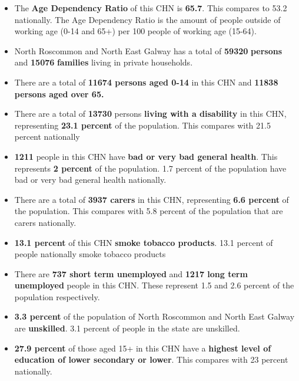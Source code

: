 \documentclass{article}
\begin{document}
\begin{itemize}

\item The \textbf{Age Dependency Ratio} of this CHN is  \textbf{65.7}. This compares to 53.2 nationally. The Age Dependency Ratio is the amount of people outside of working age (0-14 and 65+) per 100 people of working age (15-64). 

\item North Roscommon and North East Galway has a total of \textbf{\num{59320}} \textbf{persons} and  \textbf{\num{15076}} \textbf{families} living in private households.

\item There are a total of \textbf{\num{11674} persons aged 0-14} in this CHN and \textbf{\num{11838} persons aged over 65.} 

\item There are a total of \textbf{\num{13730}} persons \textbf{living with a disability} in this CHN, representing \textbf{23.1 percent} of the population. This compares with  21.5 percent nationally

\item \textbf{\num{1211}} people in this CHN have \textbf{bad or very bad general health}. This represents \textbf{2 percent} of the population. 1.7 percent of the population have bad or very bad general health nationally. 

\item There are a total of \textbf{\num{3937} carers} in this CHN, representing \textbf{6.6 percent} of the population. This compares with 5.8 percent of the population that are carers nationally. 

\item \textbf{13.1 percent} of this CHN \textbf{smoke tobacco products}. 13.1 percent of people nationally smoke tobacco products

\item There are \textbf{\num{737} short term unemployed} and \textbf{\num{1217} long term unemployed} people in this CHN. These represent 1.5 and 2.6 percent of the population respectively.

\item  \textbf{3.3 percent} of the population of North Roscommon and North East Galway are \textbf{unskilled}. 3.1 percent of people in the state are unskilled.

\item \textbf{27.9 percent} of those aged 15+ in this CHN have a \textbf{highest level of education of lower secondary or lower}. This compares with 23 percent nationally. 


\end{itemize}
\end{document}

